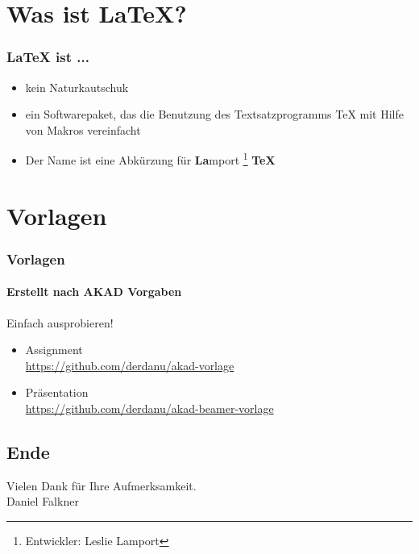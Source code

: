 \documentclass[xcolor=dvipsnames]{beamer}
\subtitle{Wissenschaftliche Arbeiten ohne Haarausfall} %
\institute{AKAD Pinneberg} %
\title{\Title}
\author{\Author}
\date{\today}
\newcommand*{\Author}{Daniel Falkner} %
\begin{document}
\begin{frame}
    \titlepage
\end{frame}


\frame{\tableofcontents} 

 


\section{Was ist \LaTeX{}?}
\begin{frame}
  \frametitle{\LaTeX{} ist ... }
	\begin{itemize}
  		\item kein Naturkautschuk \pause
	  	\item ein Softwarepaket, das die Benutzung des Textsatzprogramms \TeX{} mit Hilfe von Makros vereinfacht \pause
	  	\item Der Name ist eine Abkürzung für \textbf{La}mport \footnote<3>{Entwickler: Leslie Lamport} \textbf{TeX}
	\end{itemize}
\end{frame}

\section{Vorlagen}
\begin{frame}
  \frametitle{Vorlagen}
  \framesubtitle{Erstellt nach AKAD Vorgaben}
	 \begin{block}{Einfach ausprobieren!}
	  \begin{itemize}
  		\item Assignment \\ \url{https://github.com/derdanu/akad-vorlage}
	  	\item Präsentation \\ \url{https://github.com/derdanu/akad-beamer-vorlage}
	  \end{itemize}
  \end{block}	


\end{frame}

\subsection*{Ende}
\begin{frame}
	\begin{block}{}	
		\begin{center}
			Vielen Dank für Ihre Aufmerksamkeit. \\
			\Author{}
		\end{center}	
	\end{block}
\end{frame}
\end{document}
